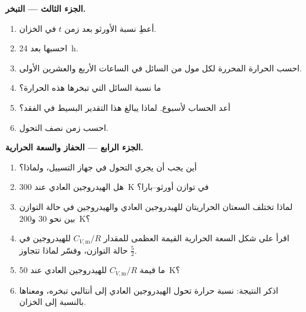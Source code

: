 \begin{problem}
\medskip\noindent\textbf{الجزء الثالث --- التبخر.}
\begin{enumerate}[resume]
  \item أعطِ نسبة الأورثو بعد زمن $t$ في الخزان.
  \item احسبها بعد \qty{24}{h}.
  \item احسب الحرارة المحررة لكل مول من السائل في الساعات الأربع والعشرين الأولى.
  \item ما نسبة السائل التي تبخرها هذه الحرارة؟
  \item أعد الحساب لأسبوع. لماذا يبالغ هذا التقدير البسيط في الفقد؟
  \item احسب زمن نصف التحول.
\end{enumerate}

\medskip\noindent\textbf{الجزء الرابع --- الحفاز والسعة الحرارية.}
\begin{enumerate}[resume]
  \item أين يجب أن يجري التحول في جهاز التسييل، ولماذا؟
  \item هل الهيدروجين العادي عند \qty{300}{K} في توازن أورثو--بارا؟
  \item لماذا تختلف السعتان الحراريتان للهيدروجين العادي والهيدروجين في حالة التوازن
        بين نحو 30 و\qty{200}{K}؟
  \item اقرأ على شكل السعة الحرارية القيمة العظمى للمقدار $C_{V,\mathrm m}/R$ للهيدروجين في حالة
        التوازن، وفسّر لماذا تتجاوز $\frac52$.
  \item ما قيمة $C_{V,\mathrm m}/R$ للهيدروجين العادي عند \qty{50}{K}؟
  \item اذكر النتيجة: نسبة حرارة تحول الهيدروجين العادي
        إلى أنتالبي تبخره، ومعناها بالنسبة إلى الخزان.
\end{enumerate}
\end{problem}
